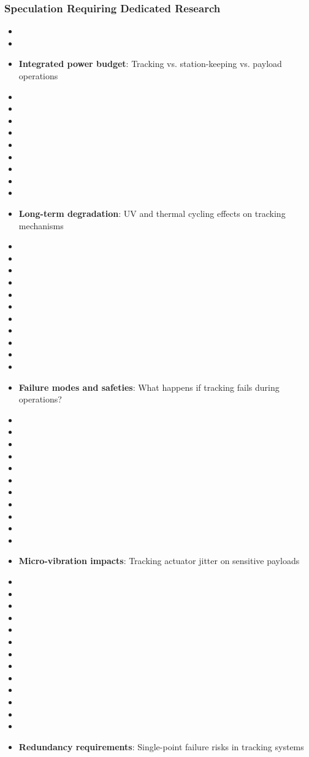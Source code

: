 {{{{\subsubsection{Speculation Requiring Dedicated Research}
\begin{itemize}
    \item \item \item \textbf{Integrated power budget}: Tracking vs. station-keeping vs. payload operations
    \item \item \item \item \item \item \item \item \item \item \textbf{Long-term degradation}: UV and thermal cycling effects on tracking mechanisms
    \item \item \item \item \item \item \item \item \item \item \item \item \textbf{Failure modes and safeties}: What happens if tracking fails during operations?
    \item \item \item \item \item \item \item \item \item \item \item \item \textbf{Micro-vibration impacts}: Tracking actuator jitter on sensitive payloads
    \item \item \item \item \item \item \item \item \item \item \item \item \item \item \textbf{Redundancy requirements}: Single-point failure risks in tracking systems
\end{itemize}

}}}}
